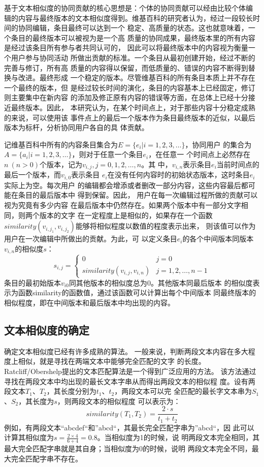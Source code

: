 基于文本相似度的协同贡献的核心思想是：个体的协同贡献可以经由比较个体编
辑的内容与最终版本的文本相似度得到。维基百科的研究者认为，经过一段较长时间的协同编辑，条目最终可以达到一个
稳定、高质量的状态。这也就意味着，一个条目的最终版本可以被视为是一个高
质量的协同成果，最终版本里的所有内容是经过该条目所有参与者共同认可的，
因此可以将最终版本中的内容视为衡量一个用户参与协同活动
所做出贡献的标准。一个条目从最初创建开始，经过不断的完善与修订，所有高
质量的内容得以保留，而低质量的、错误的内容不断得到替换与改进。最终形成
一个稳定的版本。尽管维基百科的所有条目本质上并不存在一个最终的版本，但
是经过较长时间的演化，条目的内容基本上已经固定，修订则主要集中在新内容
的添加及修正原有内容的错误等方面，在总体上已经十分接近最终版本。因此，
本研究认为，在某个时间点上，对于那些内容十分稳定成熟的来说，可以使用该
事件点上的最后一个版本作为条目最终版本的近似，以最后版本为标杆，分析协同用户各自的具
体贡献。

记维基百科中所有的内容条目集合为$E=\{e_i|i=1,2,3,\ldots \}$，协同用户
的集合为$A=\{a_i|i=1,2,3,\ldots \}$，则对于任意一个条目$e_i$，在任意一
个时间点上必然存在$n \ (n>0)$个版本，记为$v_{i,j} , j=0,1,2,\ldots,n$。其
中，$v_{i,n}$表示条目$e_i$当前时间点的最后一个版本，而$v_{i,0}$表示条目
$e_i$在没有任何内容时的初始状态版本，这时条目$e_i$实际上为空。每次用户
的编辑都会增添或者删改一部分内容，这些内容最后都可能在条目的最后版本中
得到保留。因此， 用户在每一次编辑过程所做的贡献可以视为究竟有多少内容
在最后版本中仍然存在。如果两个版本中有一部分文字相同，则两个版本的文字
在一定程度上是相似的，如果存在一个函数
$similarity(v_{i,j_1},v_{i,j_2})$能够将相似程度以数值的程度表示出来，
则该值可以作为用户在一次编辑中所做出的贡献。为此，可
以定义条目$e_i$的各个中间版本同版本$v_{i,n}$的相似度$s$：
\[
s_{i,j}=
\left\{
  \begin{array}{ll}
   0&j=0\\
   similarity(v_{i,j},v_{i,n})&j=1,2,\ldots,n-1 
  \end{array}
  \right.
\]
条目的最初始版本$v_{i0}$同其他版本的相似度总为$0$。其他版本同最后版本
的相似度表示为函数similarity的函数值，通过该函数可以计算出每个中间版本
同最终版本的相似程度，即在中间版本和最后版本中均出现的内容。

\subsection{文本相似度的确定}
\label{sec:similarity}

确定文本相似度已经有许多成熟的算法。
一般来说，判断两段文本内容在多大程度上相似，就是寻找在两端文本中能够完全匹配的文字
的长度。Ratcliff/Obershelp提出的文本匹配算法是一个得到广泛应用的方法。
该方法通过寻找在两段文本中均出现的最长文本字串从而得出两段文本的相似程
度。设有两段文本$T_1$、$T_2$，其长度分别为$t_1$、$t_2$，两段文本可以完
全匹配的最长字文本串为$S_1$、$S_2$，其长度为$s$，则两段文本的相似程度
可以表示为：
\[
similarity(T_1,T_2)=\frac{2 \cdot  s}{t_1+t_2}
\]
例如，有两段文本“abcdef“和”abcd“，其最长完全匹配字串为”abcd“，因
此可以计算其相似度为$s=\frac{2 \times 4}{6+4}=0.8$。当相似度为1的时候，说
明两段文本完全相同，其最大完全匹配字串就是其自身；当相似度为0的时候，说明
两段文本完全不同，最大完全匹配字串不存在。


